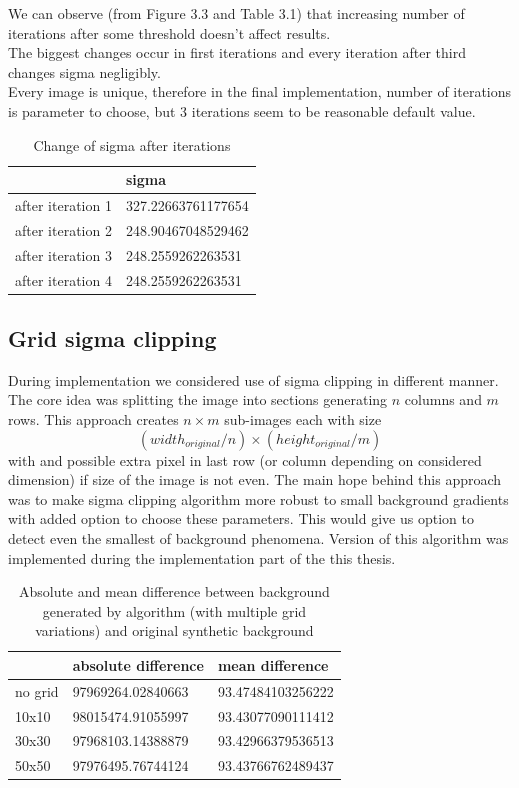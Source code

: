 \documentclass[12pt, a4paper, oneside]{book}
\begin{document}
We can observe (from Figure 3.3 and Table 3.1) that increasing number of iterations after some threshold doesn't affect results.\\
The biggest changes occur in first iterations and every iteration after third changes sigma negligibly.\\
Every image is unique, therefore in the final implementation, number of iterations is parameter to choose, but 3 iterations seem to be reasonable default value.

\begin{table}[]
    \centering
\begin{tabular}{|l|l|}
\hline
                  & sigma               \\ \hline
after iteration 1 & 327.22663761177654 \\ \hline
after iteration 2 & 248.90467048529462 \\ \hline
after iteration 3 & 248.2559262263531  \\ \hline
after iteration 4 & 248.2559262263531 \\ \hline
\end{tabular}
    \caption{Change of sigma after iterations}
    \label{tab:sigma}
\end{table}

\subsection{Grid sigma clipping}
During implementation we considered use of sigma clipping in different manner.
The core idea was splitting the image into sections generating $n$ columns and $m$ rows.
This approach creates $n \times m$ sub-images each with size
\begin{equation}
    (width_{original}/n) \times (height_{original}/m)
\end{equation}
with and possible extra pixel in last row (or column depending on considered dimension) if size of the image is not even.
The main hope behind this approach was to make sigma clipping algorithm more robust to small background gradients with added option to choose these parameters.
This would give us option to detect even the smallest of background phenomena.
Version of this algorithm was implemented during the implementation part of the this thesis.


\clearpage
\begin{table}[]
    \centering
\begin{tabular}{|l|l|l|}
\hline
                  & absolute difference & mean difference\\ \hline
    no grid & 97969264.02840663 & 93.47484103256222 \\ \hline
    10x10 & 98015474.91055997 & 93.43077090111412 \\ \hline
    30x30 & 97968103.14388879 & 93.42966379536513  \\ \hline
    50x50 & 97976495.76744124 & 93.43766762489437 \\ \hline
\end{tabular}
    \caption{Absolute and mean difference between background generated by algorithm (with multiple grid variations) and original synthetic background}
    \label{tab:grid_results}
\end{table}
\end{document}
